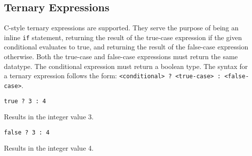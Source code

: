 
\subsection{Ternary Expressions}
{
	C-style ternary expressions are supported.
	They serve the purpose of being an inline \texttt{if}
	statement, returning the result of the true-case expression
	if the given conditional evaluates to true, and returning the result
	of the false-case expression otherwise.
	Both the true-case and false-case expressions must return the same
	datatype. The conditional expression must return a boolean type.
	The syntax for a ternary expression follows the
	form: \texttt{<conditional> ? <true-case> : <false-case>}.
	
	\begin{itemize}
	{
		\item \texttt{true ? 3 : 4}
		
			Results in the integer value 3.
		
		\item \texttt{false ? 3 : 4}
		
			Results in the integer value 4.
	}
	\end{itemize}
}
